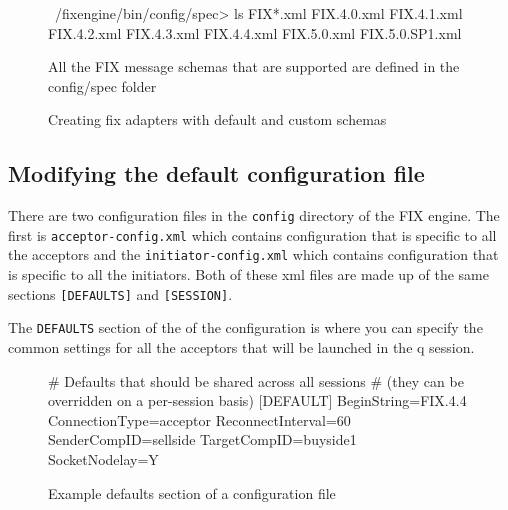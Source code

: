 \begin{figure}[H]
\begin{qcode}
~/fixengine/bin/config/spec> ls FIX*.xml
FIX.4.0.xml
FIX.4.1.xml
FIX.4.2.xml
FIX.4.3.xml
FIX.4.4.xml
FIX.5.0.xml
FIX.5.0.SP1.xml
\end{qcode}
\caption{All the FIX message schemas that are supported are defined in the config/spec folder}
\end{figure}

\begin{figure}[H]
\caption{Creating fix adapters with default and custom schemas}
\end{figure}

\subsection{Modifying the default configuration file}
There are two configuration files in the \verb|config| directory of the FIX engine. The first
is \verb|acceptor-config.xml| which contains configuration that is specific to all the acceptors
and the \verb|initiator-config.xml| which contains configuration that is specific to all the initiators. Both of these xml files are made up of the same sections \verb|[DEFAULTS]| and \verb|[SESSION]|. 

The \verb|DEFAULTS| section of the of the configuration is where you can specify the common settings for all the acceptors that will be launched in the q session.

\begin{figure}[H]
\begin{inicode}
# Defaults that should be shared across all sessions
# (they can be overridden on a per-session basis)
[DEFAULT]
BeginString=FIX.4.4
ConnectionType=acceptor
ReconnectInterval=60
SenderCompID=sellside
TargetCompID=buyside1
SocketNodelay=Y
\end{inicode}
\caption{Example defaults section of a configuration file}
\end{figure}

